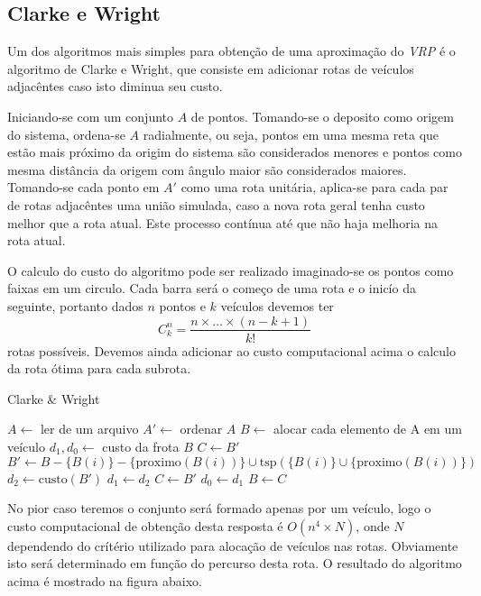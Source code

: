 \documentclass[a4paper, 12pt]{article}
\begin{document}
\subsection{Clarke e Wright}

	Um dos algoritmos mais simples para obtenção de uma aproximação do
\emph{VRP} é o algoritmo de Clarke e Wright, que consiste em adicionar rotas de
veículos adjacêntes caso isto diminua seu custo.


	Iniciando-se com um conjunto $A$ de pontos. Tomando-se o deposito como
origem do sistema, ordena-se $A$ radialmente, ou seja, pontos em uma mesma reta
que estão mais próximo da origim do sistema são considerados menores e pontos
como mesma distância da origem com ângulo maior são considerados maiores.
Tomando-se cada ponto em $A'$ como uma rota unitária, aplica-se para cada par de
rotas adjacêntes uma união simulada, caso a nova rota geral tenha custo melhor
que a rota atual. Este processo contínua até que não haja melhoria na rota
atual.

	O calculo do custo do algoritmo pode ser realizado imaginado-se os pontos
como faixas em um circulo. Cada barra será o começo de uma rota e o inicío da
seguinte, portanto dados $n$ pontos e $k$ veículos devemos ter
	\[C_k^n = \frac{n\times\ldots\times(n-k+1)}{k!}\] 
	rotas possíveis. Devemos ainda adicionar ao custo computacional acima o
calculo da rota ótima para cada subrota.

{\newcommand{\prox}[1]{\textrm{proximo}(#1)}
\newcommand{\tsp}[1]{\textrm{tsp}(#1)}
\newcommand{\cust}[1]{\textrm{custo}(#1)}
\begin{algorithm}[H]
\caption{Clarke \& Wright}
\begin{algorithmic}
	\State $A \leftarrow $ ler de um arquivo
	\State $A' \leftarrow$ ordenar $A$
	\State $B \leftarrow$ alocar cada elemento de A em um veículo
	\State $d_1,d_0 \leftarrow $ custo da frota $B$
	\State $C \leftarrow B'$
			\State $B' \leftarrow B-\{B(i)\}-\{\prox{B(i)}\}\cup\tsp{\{B(i)\}\cup\{\prox{B(i)}\}}$ 
			\State $d_2 \leftarrow \cust{B'}$
				\State $d_1 \leftarrow d_2$
				\State $C \leftarrow B'$
			\EndIf
		\EndFor
			\State $d_0 \leftarrow d_1$
			\State $B \leftarrow C$
		\EndIf
	\EndWhile
\end{algorithmic}
\end{algorithm}
}

	No pior caso teremos o conjunto será formado apenas por um veículo, logo o
custo computacional de obtenção desta resposta é $O(n^4\times N)$, onde $N$ dependendo do
crítério utilizado para alocação de veículos nas rotas. Obviamente isto será
determinado em função do percurso desta rota. O resultado do algoritmo acima é
mostrado na figura abaixo.
\end{document}

